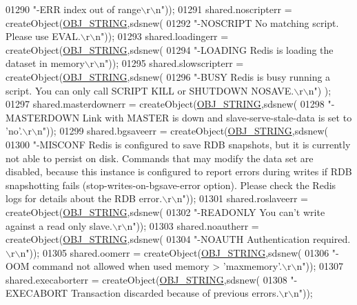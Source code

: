 \begin{DoxyCode}
{{{{{{{{{{{{01290         \textcolor{stringliteral}{"-ERR index out of range\(\backslash\)r\(\backslash\)n"}));
01291     shared.noscripterr = createObject(\hyperlink{server_8h_a65236ea160f69cdef33ec942092af88f}{OBJ\_STRING},sdsnew(
01292         \textcolor{stringliteral}{"-NOSCRIPT No matching script. Please use EVAL.\(\backslash\)r\(\backslash\)n"}));
01293     shared.loadingerr = createObject(\hyperlink{server_8h_a65236ea160f69cdef33ec942092af88f}{OBJ\_STRING},sdsnew(
01294         \textcolor{stringliteral}{"-LOADING Redis is loading the dataset in memory\(\backslash\)r\(\backslash\)n"}));
01295     shared.slowscripterr = createObject(\hyperlink{server_8h_a65236ea160f69cdef33ec942092af88f}{OBJ\_STRING},sdsnew(
01296         \textcolor{stringliteral}{"-BUSY Redis is busy running a script. You can only call SCRIPT KILL or SHUTDOWN NOSAVE.\(\backslash\)r\(\backslash\)n"})
      );
01297     shared.masterdownerr = createObject(\hyperlink{server_8h_a65236ea160f69cdef33ec942092af88f}{OBJ\_STRING},sdsnew(
01298         \textcolor{stringliteral}{"-MASTERDOWN Link with MASTER is down and slave-serve-stale-data is set to 'no'.\(\backslash\)r\(\backslash\)n"}));
01299     shared.bgsaveerr = createObject(\hyperlink{server_8h_a65236ea160f69cdef33ec942092af88f}{OBJ\_STRING},sdsnew(
01300         \textcolor{stringliteral}{"-MISCONF Redis is configured to save RDB snapshots, but it is currently not able to persist
       on disk. Commands that may modify the data set are disabled, because this instance is configured to report
       errors during writes if RDB snapshotting fails (stop-writes-on-bgsave-error option). Please check the Redis
       logs for details about the RDB error.\(\backslash\)r\(\backslash\)n"}));
01301     shared.roslaveerr = createObject(\hyperlink{server_8h_a65236ea160f69cdef33ec942092af88f}{OBJ\_STRING},sdsnew(
01302         \textcolor{stringliteral}{"-READONLY You can't write against a read only slave.\(\backslash\)r\(\backslash\)n"}));
01303     shared.noautherr = createObject(\hyperlink{server_8h_a65236ea160f69cdef33ec942092af88f}{OBJ\_STRING},sdsnew(
01304         \textcolor{stringliteral}{"-NOAUTH Authentication required.\(\backslash\)r\(\backslash\)n"}));
01305     shared.oomerr = createObject(\hyperlink{server_8h_a65236ea160f69cdef33ec942092af88f}{OBJ\_STRING},sdsnew(
01306         \textcolor{stringliteral}{"-OOM command not allowed when used memory > 'maxmemory'.\(\backslash\)r\(\backslash\)n"}));
01307     shared.execaborterr = createObject(\hyperlink{server_8h_a65236ea160f69cdef33ec942092af88f}{OBJ\_STRING},sdsnew(
01308         \textcolor{stringliteral}{"-EXECABORT Transaction discarded because of previous errors.\(\backslash\)r\(\backslash\)n"}));
}}}}}}}}}}}}
\end{DoxyCode}
